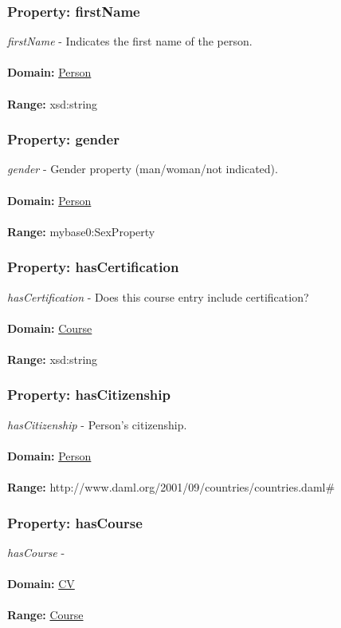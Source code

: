 \documentclass[a4paper,12pt]{article}
\numberwithin{equation}{section}
\begin{document}
\subsubsection{Property: firstName}\hypertarget{firstName}{}
\textit{firstName} - Indicates the first name of the person.
\\\\
\textbf{Domain:} \hyperlink{Person}{Person} 
\\\\
\textbf{Range:}  xsd:string

\subsubsection{Property: gender}\hypertarget{gender}{}
\textit{gender} - Gender property (man/woman/not indicated).
\\\\
\textbf{Domain:} \hyperlink{Person}{Person} 
\\\\
\textbf{Range:}  mybase0:SexProperty

\subsubsection{Property: hasCertification}\hypertarget{hasCertification}{}
\textit{hasCertification} - Does this course entry include certification?
\\\\
\textbf{Domain:} \hyperlink{Course}{Course} 
\\\\
\textbf{Range:}  xsd:string

\subsubsection{Property: hasCitizenship}\hypertarget{hasCitizenship}{}
\textit{hasCitizenship} - Person's citizenship.
\\\\
\textbf{Domain:} \hyperlink{Person}{Person} 
\\\\
\textbf{Range:}  http://www.daml.org/2001/09/countries/countries.daml\#

\subsubsection{Property: hasCourse}\hypertarget{hasCourse}{}
\textit{hasCourse} - 
\\\\
\textbf{Domain:} \hyperlink{CV}{CV} 
\\\\
\textbf{Range:}  \hyperlink{Course}{Course} 
\end{document}
